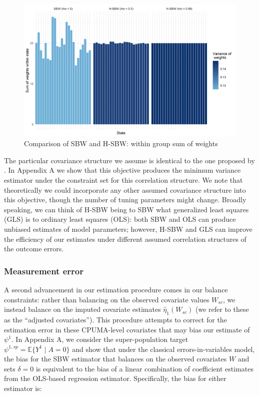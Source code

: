 \documentclass[article]{imsart}
\theoremstyle{plain}
\theoremstyle{remark}
\begin{document}
\begin{figure}
\begin{center}
    \includegraphics[scale=0.5]{01_Plots/proofofconcept.png}
    \caption{Comparison of SBW and H-SBW: within group sum of weights}
    \label{oatepref}
\end{center}
\end{figure}

The particular covariance structure we assume is identical to the one proposed by \cite{kloek1981ols}. In Appendix A we show that this objective produces the minimum variance estimator under the constraint set for this correlation structure. We note that theoretically we could incorporate any other assumed covariance structure into this objective, though the number of tuning parameters might change. Broadly speaking, we can think of H-SBW being to SBW what generalized least squares (GLS) is to ordinary least squares (OLS): both SBW and OLS can produce unbiased estimates of model parameters; however, H-SBW and GLS can improve the efficiency of our estimates under different assumed correlation structures of the outcome errors.

\subsubsection{Measurement error}

A second advancement in our estimation procedure comes in our balance constraints: rather than balancing on the observed covariate values $W_{sc}$, we instead balance on the imputed covariate estimates $\hat{\eta}_1(W_{sc})$ (we refer to these as the ``adjusted covariates''). This procedure attempts to correct for the estimation error in these CPUMA-level covariates that may bias our estimate of $\psi^1$. In Appendix A, we consider the super-population target $\psi^{1, sp} = \mathbb{E}\{Y^1 \mid A = 0\}$ and show that under the classical errors-in-variables model, the bias for the SBW estimator that balances on the observed covariates $W$ and sets $\delta = 0$ is equivalent to the bias of a linear combination of coefficient estimates from the OLS-based regression estimator. Specifically, the bias for either estimator is:
\end{document}
